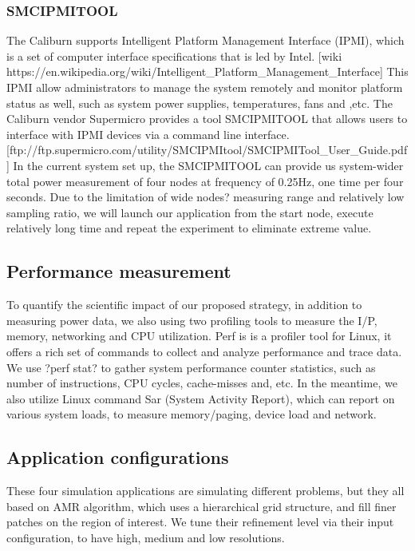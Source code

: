 \subsubsection{SMCIPMITOOL}
The Caliburn supports Intelligent Platform Management Interface (IPMI), which is a set of computer interface specifications that is led by Intel. [wiki  https://en.wikipedia.org/wiki/Intelligent\_Platform\_Management\_Interface] This IPMI allow administrators to manage the system remotely and monitor platform status as well, such as system power supplies, temperatures, fans and ,etc. The Caliburn vendor Supermicro provides a tool SMCIPMITOOL that allows users to interface with IPMI devices via a command line interface.[ftp://ftp.supermicro.com/utility/SMCIPMItool/SMCIPMITool\_User\_Guide.pdf] In the current system set up, the SMCIPMITOOL can provide us system-wider total power measurement of four nodes at frequency of 0.25Hz, one time per four seconds. Due to the limitation of wide nodes? measuring range and relatively low sampling ratio, we will launch our application from the start node, execute relatively long time and repeat the experiment to eliminate extreme value.



\subsection{Performance measurement}
To quantify the scientific impact of our proposed strategy, in addition to measuring power data, we also using two profiling tools to measure the I/P, memory, networking and CPU utilization. Perf is is a profiler tool for Linux, it offers a rich set of commands to collect and analyze performance and trace data. We use ?perf stat? to gather system performance counter statistics, such as number of instructions, CPU cycles, cache-misses and, etc. In the meantime, we also utilize Linux command Sar (System Activity Report), which can report on various system loads, to measure memory/paging, device load and network.



\subsection{Application configurations}
These four simulation applications are simulating different problems, but they all based on AMR algorithm, which uses a hierarchical grid structure, and fill finer patches on the region of interest. We tune their refinement level via their input configuration, to have high, medium and low resolutions.


